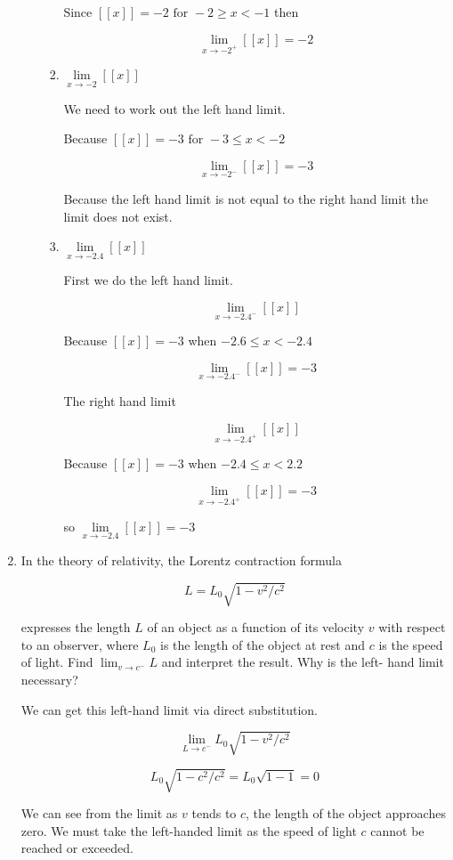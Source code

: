 \documentclass{article}
\begin{document}
\begin{enumerate}
\begin{enumerate}
\begin{enumerate}
				Since $[[x]] = -2 \text{ for } -2 \geq x < -1$ then

				$$\lim \limits _{x \to -2^{+}} [[x]] = -2$$

				\item $\lim \limits _{x \to -2} [[x]]$

				We need to work out the left hand limit.

				Because $[[x]] = -3 \text{ for } -3 \leq x < -2$

				$$\lim \limits _{x \to -2^{-}} [[x]] = -3$$

				Because the left hand limit is not equal to the right hand limit
				the limit does not exist.

				\item $\lim \limits _{x \to -2.4} [[x]]$

				First we do the left hand limit.

				$$\lim \limits _{x \to -2.4^{-}} [[x]]$$

				Because $[[x]]=-3$ when $-2.6 \leq x < -2.4$

				$$\lim \limits _{x \to -2.4^{-}} [[x]] = -3$$

				The right hand limit

				$$\lim \limits _{x \to -2.4^{+}} [[x]]$$

				Because $[[x]] = -3$ when $-2.4 \leq x < 2.2$

				$$\lim \limits _{x \to -2.4^{+}} [[x]] = -3$$

				so $\lim \limits _{x \to -2.4} [[x]]=-3$
			\end{enumerate}

		\end{enumerate}
		\item In the theory of relativity, the Lorentz contraction formula

			$$L = L_{0}\sqrt{1 - v^2/c^2}$$

			expresses the length $L$ of an object as a function of its
			velocity $v$ with respect to an observer, where $L_{0}$ is the
			length of the object at rest and $c$ is the speed of light. Find
			$\lim _{v \to c^{-}} L$ and interpret the result. Why is the left-
			hand limit necessary?

			We can get this left-hand limit via direct substitution.

			$$\lim \limits _{L \to c^{-}} L_{0}\sqrt{1 - v^2/c^2}$$

			$$L_{0}\sqrt{1-c^2/c^2} = L_{0} \sqrt{1 - 1} = 0$$

			We can see from the limit as $v$ tends to $c$, the length of the
			object approaches zero. We must take the left-handed limit as the
			speed of light $c$ cannot be reached or exceeded.


\end{enumerate}
\end{document}
